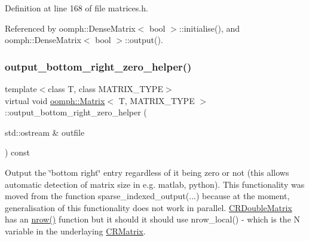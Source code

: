 Definition at line 168 of file matrices.\+h.



Referenced by oomph\+::\+Dense\+Matrix$<$ bool $>$\+::initialise(), and oomph\+::\+Dense\+Matrix$<$ bool $>$\+::output().

\mbox{\label{classoomph_1_1Matrix_a10ee338f4d3893010291a692aea04248}} 
\subsubsection{\texorpdfstring{output\+\_\+bottom\+\_\+right\+\_\+zero\+\_\+helper()}{output\_bottom\_right\_zero\_helper()}}
{\footnotesize\ttfamily template$<$class T, class M\+A\+T\+R\+I\+X\+\_\+\+T\+Y\+PE$>$ \\
virtual void \hyperlink{classoomph_1_1Matrix}{oomph\+::\+Matrix}$<$ T, M\+A\+T\+R\+I\+X\+\_\+\+T\+Y\+PE $>$\+::output\+\_\+bottom\+\_\+right\+\_\+zero\+\_\+helper (\begin{DoxyParamCaption}\item[{std\+::ostream \&}]{outfile }\end{DoxyParamCaption}) const\hspace{0.3cm}{\ttfamily [pure virtual]}}



Output the \char`\"{}bottom right\char`\"{} entry regardless of it being zero or not (this allows automatic detection of matrix size in e.\+g. matlab, python). This functionality was moved from the function sparse\+\_\+indexed\+\_\+output(...) because at the moment, generalisation of this functionality does not work in parallel. \hyperlink{classoomph_1_1CRDoubleMatrix}{C\+R\+Double\+Matrix} has an \hyperlink{classoomph_1_1Matrix_ac366ca5324d3e00e23d9800f3d5f4d5f}{nrow()} function but it should it should use nrow\+\_\+local() -\/ which is the N variable in the underlaying \hyperlink{classoomph_1_1CRMatrix}{C\+R\+Matrix}. 




